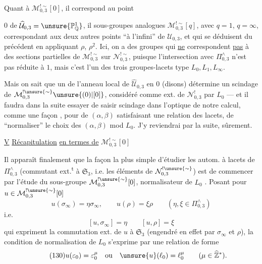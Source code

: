 Quant à $\mathcal M_{0,3}^{!\sim}[0]$, il correspond
 au point


$0$ de $\widehat{\mathcal U}_{0,3}=\unsure{\mathbb P^1_{\mathbb Q}}$,
il 
sous-groupes analogues $\mathcal M_{0,3}^{!\sim}[q]$, avec
$q=1$, $q=\infty$, correspondant aux deux autres points ``à l'infini''
de $\mathcal U_{0,3}$, et qui se déduisent du précédent en appliquant
$\rho$, $\rho^2$.
Ici, on a des groupes qui \uline{ne} correspondent \uline{pas}
 à des sections  partielles
de $\mathcal M_{0,3}^{!\sim}$ sur $\mathcal N_{0,3}^{!\sim}$,
puisque l'intersection avec $\Pi_{0,3}^{\wedge}$ n'est pas réduite à $1$,
mais c'est l'un des trois groupes-lacets type $L_0,L_1,L_\infty$.

Mais on sait que un 
de l'anneau local de $\widehat{\mathcal U}_{0,3}$ en $0$ (disons)
détermine un scindage de
$\mathcal M_{0,3}^{!\unsure{\sim}}\unsure{(0)|[0]}$, considéré comme
ext. de $\mathcal N_{0,3}^{!}$ par $L_0$ --- et il faudra
dans la suite essayer de saisir 
scindage 
dans l'optique de notre calcul, comme une façon 
, pour 
\deleted{$\alpha,\beta$}   de $(\alpha,\beta)$
satisfaisant une relation des lacets, de ``normaliser'' le choix des
$(\alpha,\beta)$ mod $L_0$.
J'y reviendrai par la suite, sûrement.


\uline{V} \uline{Récapitulation} \uline{en termes de}
$\mathcal M_{0,3}^{!\sim}[0]$

Il apparaît finalement que la façon la plus simple d'étudier les autom.
à lacets de $\Pi_{0,3}^{\wedge}$ (commutant ext.\textsuperscript{t}
à $\mathfrak S_3$, i.e. les éléments de 
$\mathcal N_{0,3}^{!\unsure{\sim}}$) est de commencer par l'étude du
sous-groupe $\mathcal M_{0,3}^{!\unsure{\sim}}[0]$, normalisateur
de $L_0$ .
Posant pour $u\in\mathcal M_{0,3}^{!\unsure{\sim}}[0]$
\[
\tag{128}
u(\sigma_\infty)=\eta\sigma_\infty,
\qquad u(\rho)=\xi\rho
\qquad(\eta,\xi\in\Pi_{0,3}^{\wedge})
\]
i.e.
\[
\tag{129}
[u,\sigma_\infty]=\eta\qquad [u,\rho]=\xi
\]
qui expriment la commutation ext. de $u$ à $\mathfrak S_3$
(engendré en effet par $\sigma_\infty$ et $\rho$), la condition de
normalisation de $L_0$ s'exprime par une relation de forme
\[
\tag{130}
u(\varepsilon_0)=\varepsilon_0^\mu
\quad\text{ou}\quad \unsure{u}(\ell_0)=\ell_0^\mu
\qquad(\mu\in\widehat{\mathbb Z}^{*}).
\]

